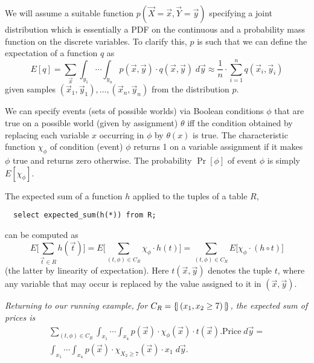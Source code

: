 We    will   assume    a    suitable   function    $p(\vec{X}=\vec{x},
\vec{Y}=\vec{y})$ specifying a joint distribution which is essentially
a  PDF  on the  continuous  and a  probability  mass  function on  the
discrete variables.  To clarify  this, $p$ is such that
we can define the expectation of a function $q$ as
\[
E[q] =
\sum_{\vec{x}} \int_{y_1} \cdots \int_{y_n}
p(\vec{x}, \vec{y}) \cdot q(\vec{x}, \vec{y}) \; d \vec{y} \approx 
\frac{1}{n} \cdot \sum_{i=1}^n q(\vec{x}_i, \vec{y}_i)
\]
given samples $(\vec{x}_1, \vec{y}_1), \dots, (\vec{x}_n, \vec{y}_n)$ from
the distribution $p$.



We can specify events (sets of possible worlds) via Boolean conditions
$\phi$  that  are true  on  a  possible  world (given  by  assignment)
$\theta$  iff the condition  obtained by  replacing each  variable $x$
occurring  in  $\phi$  by  $\theta(x)$ is  true.   The  characteristic
function  $\chi_\phi$  of condition  (event)  $\phi$  returns  1 on  a
variable  assignment  if  it   makes  $\phi$  true  and  returns  zero
otherwise.   The probability  $\Pr[\phi]$  of event  $\phi$ is  simply
$E[\chi_\phi]$.

The expected  sum of a function $h$  applied to the tuples  of a table
$R$,
{\small\begin{verbatim}
  select expected_sum(h(*)) from R;
\end{verbatim}}
\noindent can be computed as
\[
E \Big[ \sum_{\vec{t}  \in R}  h(\vec{t}) \Big]  =
E \Big[ \sum_{(t, \phi) \in C_R} \chi_\phi \cdot h(t) \Big] =
\sum_{(t, \phi) \in C_R} E \Big[ \chi_\phi \cdot (h \circ t) \Big]
\]
(the latter by linearity of expectation).
Here $t(\vec{x}, \vec{y})$ denotes
the tuple $t$, where any variable that may occur is replaced by
the value assigned to it in $(\vec{x}, \vec{y})$.


\begin{example}\em
Returning to our running example, for $C_R = \{\!|\, (x_1, x_2 \ge 7) \,|\!\}$, the expected sum of prices is
\begin{multline*}
   \sum_{(t,  \phi) \in  C_R}
   \int_{x_1} \cdots
   \int_{x_4}  p(\vec{x})  \cdot  \chi_\phi(\vec{x})
   \cdot t(\vec{x}).\mathrm{Price} \; d \vec{y}
= \\
   \int_{x_1} \cdots
   \int_{x_4}  p(\vec{x})  \cdot  \chi_{X_2 \ge 7}(\vec{x})
   \cdot x_1 \; d \vec{y}.
\end{multline*}
\end{example}\ \\


